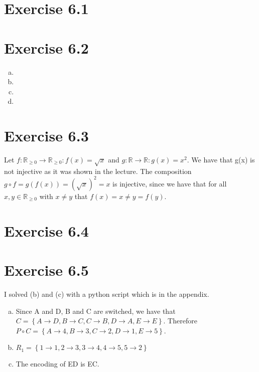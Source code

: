 \documentclass{article} %
\newcommand{\homeworkNumber}{6}
\begin{document}
\section*{Exercise \homeworkNumber.1}




\section*{Exercise \homeworkNumber.2}

\begin{enumerate}[(a)]
	\item
	\item
	\item
	\item
\end{enumerate}



\section*{Exercise \homeworkNumber.3}
Let \( f \colon \mathbb{R}_{\geq 0} \to \mathbb{R}_{\geq 0} \colon f(x) = \sqrt{x}  \)
and \( g \colon \mathbb{R} \to \mathbb{R} \colon g(x) = x^2  \).
We have that g(x) is not injective as it was shown in the lecture.
The composition \( g \circ f = g(f(x)) = (\sqrt{x})^2 = x \) is injective,
since we have that for all \( x,y \in  \mathbb{R}_{\geq 0} \) with \( x \neq y \) that \( f(x) = x \neq y = f(y) \).



\section*{Exercise \homeworkNumber.4}



\section*{Exercise \homeworkNumber.5}
I solved (b) and (c) with a python script which is in the appendix.
\begin{enumerate}[(a)]
	\item Since A and D, B and C are switched, we have that \( C = \left\{ A \to D, B \to C, C \to B, D \to A, E \to E \right\}  \). Therefore \( P \circ C = \left\{ A \to 4, B \to 3, C \to 2, D \to 1, E \to 5 \right\} \).
	\item \( R_{1} = \left\{ 1 \to 1, 2 \to 3, 3 \to 4, 4 \to 5, 5 \to 2 \right\}  \)
	\item The encoding of ED is EC.
\end{enumerate}
\end{document}
